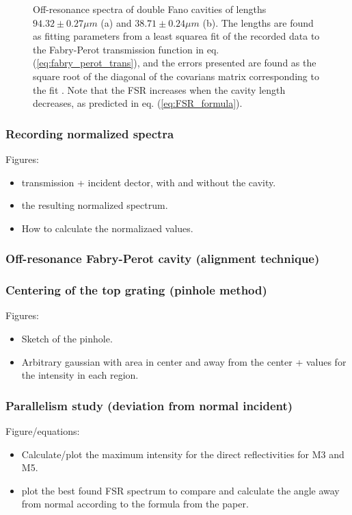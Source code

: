 \begin{figure}[h!]
\begin{subfigure}[b]{0.49\textwidth}
        \caption{}
        \label{fig:40um_FSR}
    \end{subfigure}
    \caption{Off-resonance spectra of double Fano cavities of lengths $94.32 \pm 0.27 \mu m$ (a) and $38.71 \pm 0.24 \mu m$ (b). The lengths are found as fitting parameters from a least squarea fit of the recorded data to the Fabry-Perot transmission function in eq. (\ref{eq:fabry_perot_trans}), and the errors presented are found as the square root of the diagonal of the covarians matrix corresponding to the fit \cite{Hughes}. Note that the FSR increases when the cavity length decreases, as predicted in eq. (\ref{eq:FSR_formula}).}
    \label{fig:length_from_long_scan_example}    
\end{figure}


\subsubsection{Recording normalized spectra}

Figures: 
\begin{itemize}
    \item transmission + incident dector, with and without the cavity.
    \item the resulting normalized spectrum.
    \item How to calculate the normalizaed values.
\end{itemize}


\subsubsection{Off-resonance Fabry-Perot cavity (alignment technique)}

\subsubsection{Centering of the top grating (pinhole method)}\label{sec:pinhole_method}

Figures: 
\begin{itemize}
    \item Sketch of the pinhole. 
    \item Arbitrary gaussian with area in center and away from the center + values for the intensity in each region.
\end{itemize}

\subsubsection{Parallelism study (deviation from normal incident)}\label{sec:parallelism}

Figure/equations:
\begin{itemize}
    \item Calculate/plot the maximum intensity for the direct reflectivities for M3 and M5. 
    \item plot the best found FSR spectrum to compare and calculate the angle away from normal according to the formula from the paper. 
\end{itemize}

